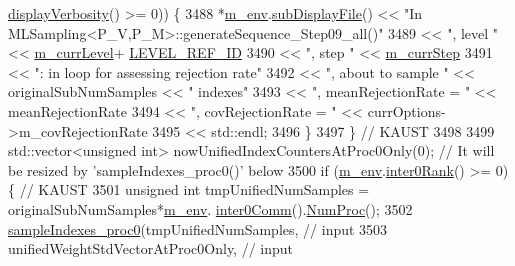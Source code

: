 \begin{DoxyCode}
      \hyperlink{class_q_u_e_s_o_1_1_base_environment_a1fe5f244fc0316a0ab3e37463f108b96}{displayVerbosity}() >= 0)) \{
3488             *\hyperlink{class_q_u_e_s_o_1_1_m_l_sampling_a13f1ca4fe9f94822fe572a743eaced1d}{m\_env}.\hyperlink{class_q_u_e_s_o_1_1_base_environment_a8a0064746ae8dddfece4229b9ad374d6}{subDisplayFile}() << \textcolor{stringliteral}{"In
       MLSampling<P\_V,P\_M>::generateSequence\_Step09\_all()"}
3489                                     << \textcolor{stringliteral}{", level "} << \hyperlink{class_q_u_e_s_o_1_1_m_l_sampling_af9416874c856e50f3b35270e801f17e4}{m\_currLevel}+
      \hyperlink{_m_l_sampling_level_options_8h_a68d15eaf394d210effcf584b938206d3}{LEVEL\_REF\_ID}
3490                                     << \textcolor{stringliteral}{", step "}  << \hyperlink{class_q_u_e_s_o_1_1_m_l_sampling_a1b1f8ccb4823bdfa26ec652f0807c63e}{m\_currStep}
3491                                     << \textcolor{stringliteral}{": in loop for assessing rejection rate"}
3492                                     << \textcolor{stringliteral}{", about to sample "}     << originalSubNumSamples << \textcolor{stringliteral}{" indexes"}
3493                                     << \textcolor{stringliteral}{", meanRejectionRate = "} << meanRejectionRate
3494                                     << \textcolor{stringliteral}{", covRejectionRate = "}  << currOptions->m\_covRejectionRate
3495                                     << std::endl;
3496           \}
3497         \} \textcolor{comment}{// KAUST}
3498 
3499         std::vector<unsigned int> nowUnifiedIndexCountersAtProc0Only(0); \textcolor{comment}{// It will be resized by
       'sampleIndexes\_proc0()' below}
3500         \textcolor{keywordflow}{if} (\hyperlink{class_q_u_e_s_o_1_1_m_l_sampling_a13f1ca4fe9f94822fe572a743eaced1d}{m\_env}.\hyperlink{class_q_u_e_s_o_1_1_base_environment_ae106b5bb8a80b655b88b3a26b1e7c185}{inter0Rank}() >= 0) \{ \textcolor{comment}{// KAUST}
3501           \textcolor{keywordtype}{unsigned} \textcolor{keywordtype}{int} tmpUnifiedNumSamples = originalSubNumSamples*\hyperlink{class_q_u_e_s_o_1_1_m_l_sampling_a13f1ca4fe9f94822fe572a743eaced1d}{m\_env}.
      \hyperlink{class_q_u_e_s_o_1_1_base_environment_a689e4d140c74d495d97eb498714a4b82}{inter0Comm}().\hyperlink{class_q_u_e_s_o_1_1_mpi_comm_aa780721ae0fdeabc5a15e04cb0cad964}{NumProc}();
3502           \hyperlink{class_q_u_e_s_o_1_1_m_l_sampling_af71979655e46135b6a3c97b8909321f0}{sampleIndexes\_proc0}(tmpUnifiedNumSamples,                \textcolor{comment}{// input}
3503                               unifiedWeightStdVectorAtProc0Only,   \textcolor{comment}{// input}

\end{DoxyCode}
